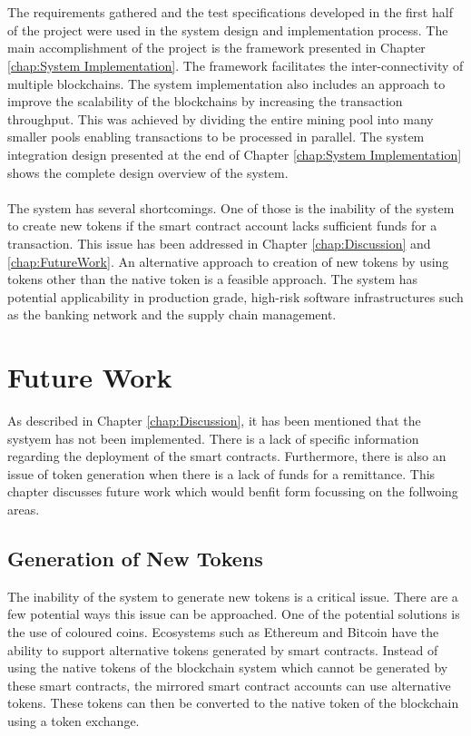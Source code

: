 \documentclass[a4paper,twoside,phd]{BYUPhys}
\begin{document}
\\
\\
The requirements gathered and the test specifications developed in the first half of the project were used in the system design and implementation process. The main accomplishment of the project is the framework presented in Chapter \ref{chap:System Implementation}. The framework facilitates the inter-connectivity of multiple blockchains. The system implementation also includes an approach to improve the scalability of the blockchains by increasing the transaction throughput. This was achieved by dividing the entire mining pool into many smaller pools enabling transactions to be processed in parallel. The system integration design presented at the end of Chapter \ref{chap:System Implementation} shows the complete design overview of the system. 
\\
\\
The system has several shortcomings. One of those is the inability of the system to create new tokens if the smart contract account lacks sufficient funds for a transaction. This issue has been addressed in Chapter \ref{chap:Discussion} and \ref{chap:FutureWork}. An alternative approach to creation of new tokens by using tokens other than the native token is a feasible approach. The system has potential applicability in production grade, high-risk software infrastructures such as the banking network and the supply chain management. 
\chapter{Future Work}
As described in Chapter \ref{chap:Discussion}, it has been mentioned that the systyem has not been implemented. There is a lack of specific information regarding the deployment of the smart contracts. Furthermore, there is also an issue of token generation when there is a lack of funds for a remittance. This chapter discusses future work which would benfit form focussing on the follwoing areas.

\section{Generation of New Tokens }
The inability of the system to generate new tokens is a critical issue. There are a few potential ways this issue can be approached. One of the potential solutions is the use of coloured coins. Ecosystems such as Ethereum and Bitcoin have the ability to support alternative tokens generated by smart contracts\cite{DigitalDraglet.com}. Instead of using the native tokens of the blockchain system which cannot be generated by these smart contracts, the mirrored smart contract accounts can use alternative tokens. These tokens can then be converted to the native token of the blockchain using a token exchange. 
\end{document}
